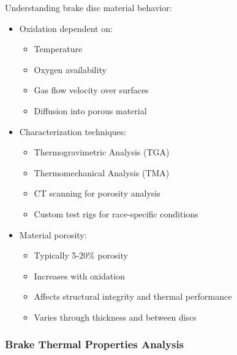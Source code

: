 Understanding brake disc material behavior:
\begin{itemize}
    \item Oxidation dependent on:
    \begin{itemize}
        \item Temperature
        \item Oxygen availability
        \item Gas flow velocity over surfaces
        \item Diffusion into porous material
    \end{itemize}
    \item Characterization techniques:
    \begin{itemize}
        \item Thermogravimetric Analysis (TGA)
        \item Thermomechanical Analysis (TMA)
        \item CT scanning for porosity analysis
        \item Custom test rigs for race-specific conditions
    \end{itemize}
    \item Material porosity:
    \begin{itemize}
        \item Typically 5-20\% porosity
        \item Increases with oxidation
        \item Affects structural integrity and thermal performance
        \item Varies through thickness and between discs
    \end{itemize}
\end{itemize}

\subsubsection*{Brake Thermal Properties Analysis}

